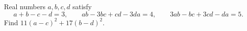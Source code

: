 Real numbers \(a,b,c,d\) satisfy
\[
a+b-c-d=3,\qquad ab-3bc+cd-3da=4,\qquad 3ab-bc+3cd-da=5.
\]
Find \(11(a-c)^2+17(b-d)^2\).
